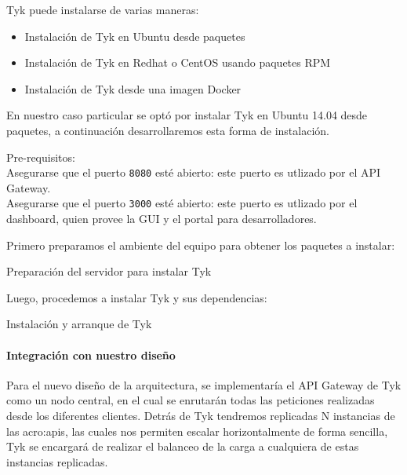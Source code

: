 Tyk puede instalarse de varias maneras:

\begin{itemize}
  \item Instalación de Tyk en Ubuntu desde paquetes
  \item Instalación de Tyk en Redhat o CentOS usando paquetes RPM
  \item Instalación de Tyk desde una imagen Docker
\end{itemize}

En nuestro caso particular se optó por instalar Tyk en Ubuntu 14.04 desde paquetes, a continuación desarrollaremos esta forma de instalación.

Pre-requisitos:\\
Asegurarse que el puerto \texttt{8080} esté abierto: este puerto es utlizado por el API Gateway.\\
Asegurarse que el puerto \texttt{3000} esté abierto: este puerto es utlizado por el dashboard, quien provee la GUI y el portal para desarrolladores.

Primero preparamos el ambiente del equipo para obtener los paquetes a instalar:

\begin{listing}[H]
  \caption{Preparación del servidor para instalar Tyk}
  \label{soa:tecnologias:tyk:bash-preparacion}
\end{listing}

Luego, procedemos a instalar Tyk y sus dependencias:

\begin{listing}[H]
  \caption{Instalación y arranque de Tyk}
  \label{soa:tecnologias:tyk:bash-instalacion}
\end{listing}


\paragraph{Integración con nuestro diseño}

Para el nuevo diseño de la arquitectura, se implementaría el API Gateway de Tyk como un nodo central, en el cual se enrutarán todas las peticiones realizadas desde los diferentes clientes.  Detrás de Tyk tendremos replicadas N instancias de las \glspl{acro:api}, las cuales nos permiten escalar horizontalmente de forma sencilla, Tyk se encargará de realizar el balanceo de la carga a cualquiera de estas instancias replicadas.

